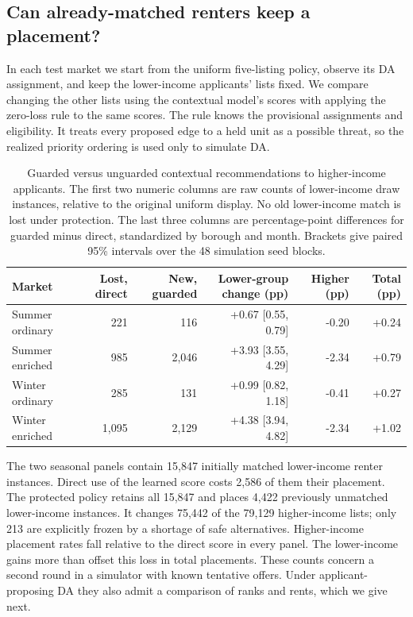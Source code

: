 \subsection{Can already-matched renters keep a placement?}
In each test market we start from the uniform five-listing policy, observe
its DA assignment, and keep the lower-income applicants' lists fixed.
We compare changing the other lists using the contextual model's scores
with applying the zero-loss rule to the same scores. The rule knows the
provisional assignments and eligibility. It treats every proposed edge to
a held unit as a possible threat, so the realized priority ordering is used
only to simulate DA.

\begin{table}[t]
\centering\small
\begin{tabular}{@{}lrrrrr@{}}\toprule
Market & Lost, direct & New, guarded & Lower-group change (pp) & Higher (pp) & Total (pp)\\\midrule
Summer ordinary & 221 & 116 & +0.67 [0.55, 0.79] & -0.20 & +0.24 \\
Summer enriched & 985 & 2,046 & +3.93 [3.55, 4.29] & -2.34 & +0.79 \\
Winter ordinary & 285 & 131 & +0.99 [0.82, 1.18] & -0.41 & +0.27 \\
Winter enriched & 1,095 & 2,129 & +4.38 [3.94, 4.82] & -2.34 & +1.02 \\
\bottomrule\end{tabular}
\caption{Guarded versus unguarded contextual recommendations to higher-income
applicants. The first two numeric columns are raw counts of lower-income draw
instances, relative to the original uniform display. No old lower-income match
is lost under protection. The last three columns are percentage-point
differences for guarded minus direct, standardized by borough and month.
Brackets give paired 95\% intervals over the 48 simulation seed blocks.}
\label{tab:guard-evidence}
\end{table}

The two seasonal panels contain 15,847 initially matched lower-income renter
instances. Direct use of the learned score costs 2,586 of them their placement.
The protected policy retains all 15,847 and places 4,422 previously unmatched
lower-income instances. It changes 75,442 of the 79,129 higher-income lists;
only 213 are explicitly frozen by a shortage of safe alternatives.
Higher-income placement rates fall relative to the direct score in every
panel. The lower-income gains more than offset this loss in total placements.
These counts concern a second round in a simulator with known tentative offers.
Under applicant-proposing DA they also admit a comparison of ranks and rents, which we give next.
